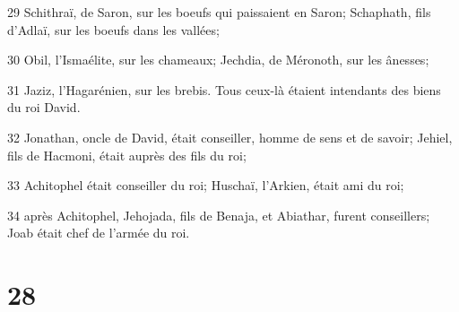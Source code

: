 \par 29 Schithraï, de Saron, sur les boeufs qui paissaient en Saron; Schaphath, fils d'Adlaï, sur les boeufs dans les vallées;
\par 30 Obil, l'Ismaélite, sur les chameaux; Jechdia, de Méronoth, sur les ânesses;
\par 31 Jaziz, l'Hagarénien, sur les brebis. Tous ceux-là étaient intendants des biens du roi David.
\par 32 Jonathan, oncle de David, était conseiller, homme de sens et de savoir; Jehiel, fils de Hacmoni, était auprès des fils du roi;
\par 33 Achitophel était conseiller du roi; Huschaï, l'Arkien, était ami du roi;
\par 34 après Achitophel, Jehojada, fils de Benaja, et Abiathar, furent conseillers; Joab était chef de l'armée du roi.

\chapter{28}

